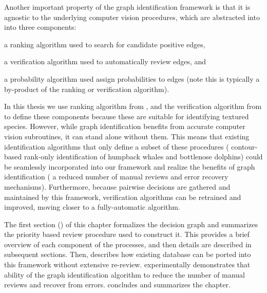 Another important property of the graph identification framework is that it is agnostic to the underlying computer
vision procedures, which are abstracted into into three components:
\begin{enumin}
\item a ranking algorithm used to search for candidate positive edges, %
\item a verification algorithm used to automatically review edges, and %
\item a probability algorithm used assign probabilities to edges (note this is typically a by-product of the
ranking or verification algorithm).
\end{enumin}
In this thesis we use ranking algorithm from , and the verification algorithm from
 to define these components because these are suitable for identifying textured species.
However, while graph identification benefits from accurate computer vision subroutines, it can stand alone without
them.  This means that existing identification algorithms that only define a subset of these procedures (\eg{}
contour-based rank-only identification of humpback whales and bottlenose dolphins) could be seamlessly incorporated
into our framework and realize the benefits of graph identification (\eg{} a reduced number of manual reviews and
error recovery mechanisms).  Furthermore, because pairwise decisions are gathered and maintained by this framework,
verification algorithms can be retrained and improved, moving closer to a fully-automatic algorithm.


The first section () of this chapter formalizes the
  decision graph and summarizes the priority based review procedure used to
  construct it.
This provides a brief overview of each component of the processes, and then
  details are described in subsequent sections.
Then,  describes how existing database can be ported into
  this framework without extensive re-review.
 experimentally demonstrates that ability of the graph
  identification algorithm to reduce the number of manual reviews and recover
  from errors.
 concludes and summarizes the chapter.



